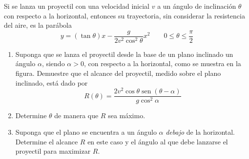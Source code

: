 \item Si se lanza un proyectil con una velocidad inicial $v$ a un ángulo de inclinación $\theta$ con respecto a la horizontal, entonces su trayectoria, sin considerar la resistencia del aire, es la parábola
$$y = (\tan \theta)x - \frac{g}{2v^2 \cos^2 \theta} x^2 \qquad 0 \le \theta \le \frac{\pi}{2}$$
\begin{enumerate}
    \item[(a)] Suponga que se lanza el proyectil desde la base de un plano inclinado un ángulo $\alpha$, siendo $\alpha > 0$, con respecto a la horizontal, como se muestra en la figura. Demuestre que el alcance del proyectil, medido sobre el plano inclinado, está dado por
    $$R(\theta) = \frac{2v^2 \cos \theta \operatorname{sen}(\theta - \alpha)}{g \cos^2 \alpha}$$
    \item[(b)] Determine $\theta$ de manera que $R$ sea máximo.
    \item[(c)] Suponga que el plano se encuentra a un ángulo $\alpha$ \textit{debajo} de la horizontal. Determine el alcance $R$ en este caso y el ángulo al que debe lanzarse el proyectil para maximizar $R$.
\end{enumerate}
\begin{center}
\end{center}
